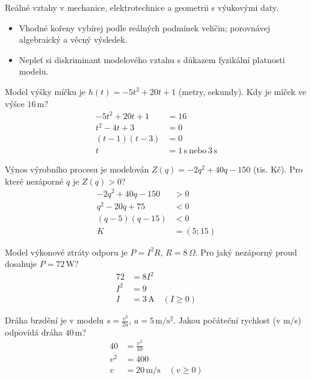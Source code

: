 \documentclass[11pt,a4paper]{article}
\begin{document}
Reálné vztahy v mechanice, elektrotechnice a geometrii s výukovými daty.
\begin{itemize}
\item Vhodné kořeny vybírej podle reálných podmínek veličin; porovnávej algebraický a věcný výsledek.
\item Nepleť si diskriminant modelového vztahu s důkazem fyzikální platnosti modelu.
\end{itemize}
\begin{prikladReseniBox}[title={Příklad 1}]
Model výšky míčku je $h(t)=-5t^2+20t+1$ (metry, sekundy). Kdy je míček ve výšce $16\,\mathrm m$?
\tcblower
\[
\begin{aligned}
-5t^2+20t+1&=16\\[2pt]
t^2-4t+3&=0\\[2pt]
(t-1)(t-3)&=0\\[2pt]
t&=1\,\mathrm s\ \text{nebo}\ 3\,\mathrm s
\end{aligned}
\]
\end{prikladReseniBox}
\begin{prikladReseniBox}[title={Příklad 2}]
Výnos výrobního procesu je modelován $Z(q)=-2q^2+40q-150$ (tis. Kč). Pro které nezáporné $q$ je $Z(q)>0$?
\tcblower
\[
\begin{aligned}
-2q^2+40q-150&>0\\[2pt]
q^2-20q+75&<0\\[2pt]
(q-5)(q-15)&<0\\[2pt]
K&=(5;15)
\end{aligned}
\]
\end{prikladReseniBox}
\begin{prikladReseniBox}[title={Příklad 3}]
Model výkonové ztráty odporu je $P=I^2R$, $R=8\,\Omega$. Pro jaký nezáporný proud dosahuje $P=72\,\mathrm W$?
\tcblower
\[
\begin{aligned}
72&=8I^2\\[2pt]
I^2&=9\\[2pt]
I&=3\,\mathrm A\quad(I\ge0)
\end{aligned}
\]
\end{prikladReseniBox}
\begin{zadaniReseniBox}[title={Samostatná práce 1}]
Dráha brzdění je v modelu $s=\frac{v^2}{2a}$, $a=5\,\mathrm{m/s^2}$. Jakou počáteční rychlost (v m/s) odpovídá dráha $40\,\mathrm m$?
\tcblower
\[
\begin{aligned}
40&=\frac{v^2}{10}\\[2pt]
v^2&=400\\[2pt]
v&=20\,\mathrm{m/s}\quad(v\ge0)
\end{aligned}
\]
\end{zadaniReseniBox}
\end{document}
